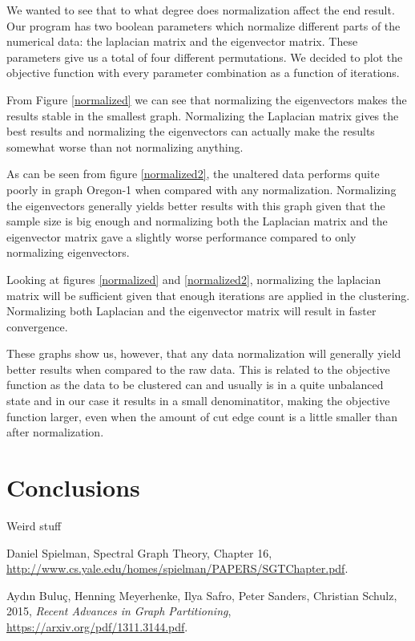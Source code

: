 \documentclass{article}
\begin{document}
\clearpage
We wanted to see that to what degree does normalization affect the end result.
Our program has two boolean parameters which normalize different parts of the numerical
data: the laplacian matrix and the eigenvector matrix. These parameters give us a total of 
four different permutations. We decided to plot the objective function with every parameter 
combination as a function of iterations. 

From Figure \ref{normalized} we can see that normalizing the eigenvectors
makes the results stable in the smallest graph. Normalizing the Laplacian matrix gives the best results and
normalizing the eigenvectors can actually make the results somewhat worse than
not normalizing anything.

As can be seen from figure \ref{normalized2}, 
the unaltered data performs quite poorly in graph Oregon-1 when compared with any normalization. Normalizing 
the eigenvectors generally yields better results with this graph given that the sample
size is big enough and normalizing both the Laplacian matrix and the eigenvector matrix
gave a slightly worse performance compared to only normalizing eigenvectors. 

Looking at figures \ref{normalized} and \ref{normalized2}, normalizing the laplacian matrix will be sufficient
given that enough iterations are applied in the clustering. Normalizing both Laplacian and the eigenvector
matrix will result in faster convergence.

These graphs show us, however, that any data normalization will generally yield better results when 
compared to the raw data. This is related to the objective function as the data to be clustered
can and usually is in a quite unbalanced state and in our case it results in a small denominatitor, making
the objective function larger, even when the amount of cut edge count is a little smaller than after
normalization.

\clearpage
\section{Conclusions}

Weird stuff



\begin{thebibliography}{99}

 Daniel Spielman, Spectral Graph Theory, Chapter 16,
	\url{http://www.cs.yale.edu/homes/spielman/PAPERS/SGTChapter.pdf}.

 Aydın Buluç, Henning Meyerhenke, Ilya Safro, Peter Sanders, Christian Schulz,
	2015, \textit{Recent Advances in Graph Partitioning},
	\url{https://arxiv.org/pdf/1311.3144.pdf}.




\end{thebibliography}

\end{document}
